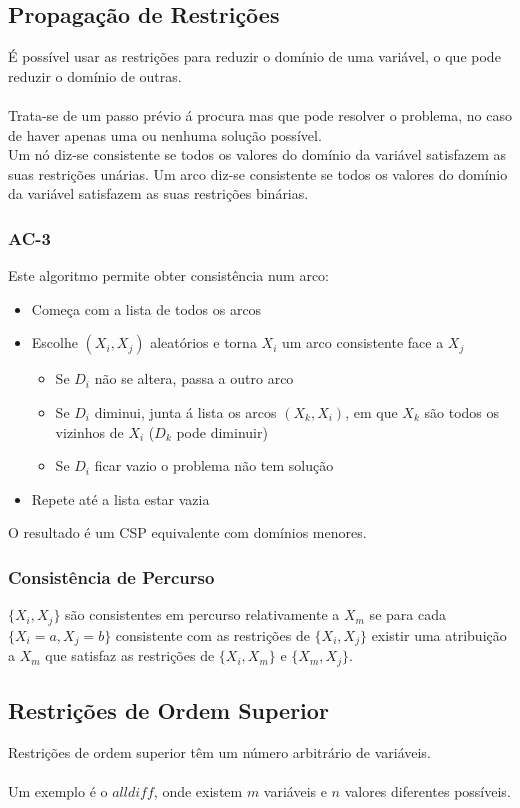 \documentclass[10pt,a4paper]{report}
\begin{document}
\subsection{Propagação de Restrições}
É possível usar as restrições para reduzir o domínio de uma variável, o que pode reduzir o domínio de outras.\\
\\
Trata-se de um passo prévio á procura mas que pode resolver o problema, no caso de haver apenas uma ou nenhuma solução possível.\\
Um nó diz-se consistente se todos os valores do domínio da variável satisfazem as suas restrições unárias. Um arco diz-se consistente se todos os valores do domínio da variável satisfazem as suas restrições binárias.
\subsubsection{AC-3}
Este algoritmo permite obter consistência num arco:
\begin{itemize}
\item Começa com a lista de todos os arcos
\item Escolhe $(X_i,X_j)$ aleatórios e torna $X_i$ um arco consistente face a $X_j$
\begin{itemize}
\item Se $D_i$ não se altera, passa a outro arco
\item Se $D_i$ diminui, junta á lista os arcos $(X_k,X_i)$, em que $X_k$ são todos os vizinhos de $X_i$ ($D_k$ pode diminuir)
\item Se $D_i$ ficar vazio o problema não tem solução
\end{itemize}
\item Repete até a lista estar vazia
\end{itemize}
O resultado é um CSP equivalente com domínios menores.
\subsubsection{Consistência de Percurso}
$\{X_i,X_j\}$ são consistentes em percurso relativamente a $X_m$ se para cada $\{X_i=a, X_j=b\}$ consistente com as restrições de $\{X_i,X_j\}$ existir uma atribuição a $X_m$ que satisfaz as restrições de $\{X_i,X_m\}$ e $\{X_m,X_j\}$.
\subsection{Restrições de Ordem Superior}
Restrições de ordem superior têm um número arbitrário de variáveis.\\
\\
Um exemplo é o $alldiff$, onde existem $m$ variáveis e $n$ valores diferentes possíveis.
\end{document}
